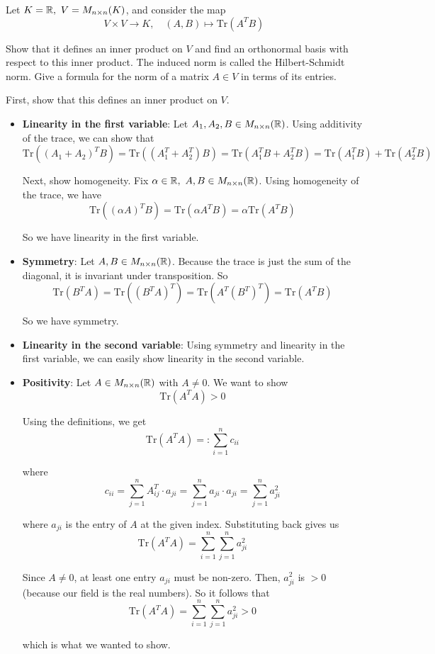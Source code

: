 \documentclass[12pt]{article}
\begin{document}
\begin{problem}{}{}
    Let $K = \mathbb{R},\ V = M_{n \times n}(K)$, and consider the map
    $$
        V \times V \rightarrow K, \quad (A, B) \mapsto \mathrm{Tr}(A^TB)
    $$

    Show that it defines an inner product on $V$ and find an orthonormal basis with respect to this inner product. The induced norm is called the Hilbert-Schmidt norm. Give a formula for the norm of a matrix $A \in V$ in terms of its entries.
\end{problem}

First, show that this defines an inner product on $V$.

\begin{itemize}
    \item \textbf{Linearity in the first variable}: Let $A_1, A_2, B \in M_{n \times n}(\mathbb{R})$. Using additivity of the trace, we can show that
    $$
        \mathrm{Tr}((A_1 + A_2)^T B) = \mathrm{Tr}((A_1^T + A_2^T) B) = \mathrm{Tr}(A_1^TB + A_2^TB) = \mathrm{Tr}(A_1^T B) + \mathrm{Tr}(A_2^T B)
    $$

    Next, show homogeneity. Fix $\alpha \in \mathbb{R},\ A, B \in M_{n \times n}(\mathbb{R})$. Using homogeneity of the trace, we have
    $$
        \mathrm{Tr}((\alpha A)^T B) = \mathrm{Tr}(\alpha A^T B) = \alpha \mathrm{Tr}(A^T B)
    $$

    So we have linearity in the first variable.

    \item \textbf{Symmetry}: Let $A, B \in M_{n \times n}(\mathbb{R})$. Because the trace is just the sum of the diagonal, it is invariant under transposition. So
    $$
        \mathrm{Tr}(B^T A) = \mathrm{Tr}((B^T A)^T) = \mathrm{Tr}(A^T (B^T)^T) = \mathrm{Tr}(A^T B)
    $$

    So we have symmetry.

    \item \textbf{Linearity in the second variable}: Using symmetry and linearity in the first variable, we can easily show linearity in the second variable.
    \item \textbf{Positivity}: Let $A \in M_{n \times n}(\mathbb{R})$ with $A \neq 0$. We want to show
    $$
        \mathrm{Tr}(A^T A) > 0
    $$

    Using the definitions, we get
    $$
        \mathrm{Tr}(A^T A) =: \sum_{i = 1}^{n} c_{ii}
    $$

    where 
    $$
        c_{ii} = \sum_{j = 1}^{n} A^T_{ij} \cdot a_{ji} = \sum_{j = 1}^{n} a_{ji} \cdot a_{ji} = \sum_{j = 1}^{n} a_{ji}^2
    $$

    where $a_{ji}$ is the entry of $A$ at the given index. Substituting back gives us
    $$
        \mathrm{Tr}(A^T A) = \sum_{i = 1}^{n} \sum_{j = 1}^{n} a_{ji}^2
    $$

    Since $A \neq 0$, at least one entry $a_{ji}$ must be non-zero. Then, $a_{ji}^2$ is $> 0$ (because our field is the real numbers). So it follows that
    $$
        \mathrm{Tr}(A^T A) = \sum_{i = 1}^{n} \sum_{j = 1}^{n} a_{ji}^2 > 0
    $$
    
    which is what we wanted to show.

\end{itemize}
\end{document}
